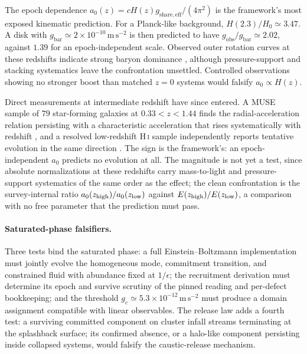 \documentclass[11pt]{article}
\begin{document}
The epoch dependence $a_0(z)=cH(z)g_{\mathrm{share,eff}}/(4\pi^2)$ is the framework's most exposed kinematic prediction. For a Planck-like background, $H(2.3)/H_0\simeq3.47$. A disk with $g_{\mathrm{bar}}\simeq2\times10^{-10}\,\mathrm{m\,s^{-2}}$ is then predicted to have $g_{\mathrm{obs}}/g_{\mathrm{bar}}\simeq2.02$, against $1.39$ for an epoch-independent scale. Observed outer rotation curves at these redshifts indicate strong baryon dominance \citep{Genzel2017,Lang2017}, although pressure-support and stacking systematics leave the confrontation unsettled. Controlled observations showing no stronger boost than matched $z=0$ systems would falsify $a_0\propto H(z)$.

Direct measurements at intermediate redshift have since entered. A MUSE sample of $79$ star-forming galaxies at $0.33<z<1.44$ finds the radial-acceleration relation persisting with a characteristic acceleration that rises systematically with redshift \citep{Ciocan2026}, and a resolved low-redshift H\,\textsc{i} sample independently reports tentative evolution in the same direction \citep{Varasteanu2025}. The sign is the framework's: an epoch-independent $a_0$ predicts no evolution at all. The magnitude is not yet a test, since absolute normalizations at these redshifts carry mass-to-light and pressure-support systematics of the same order as the effect; the clean confrontation is the survey-internal ratio $a_0(z_{\rm high})/a_0(z_{\rm low})$ against $E(z_{\rm high})/E(z_{\rm low})$, a comparison with no free parameter that the prediction must pass.



\paragraph{Saturated-phase falsifiers.}
Three tests bind the saturated phase: a full Einstein--Boltzmann implementation must jointly evolve the homogeneous mode, commitment transition, and constrained fluid with abundance fixed at $1/\epsilon$; the recruitment derivation must determine its epoch and survive scrutiny of the pinned reading and per-defect bookkeeping; and the threshold $g_c\simeq5.3\times10^{-12}\,\mathrm{m\,s^{-2}}$ must produce a domain assignment compatible with linear observables. The release law adds a fourth test: a surviving committed component on cluster infall streams terminating at the splashback surface; its confirmed absence, or a halo-like component persisting inside collapsed systems, would falsify the caustic-release mechanism.
\end{document}
